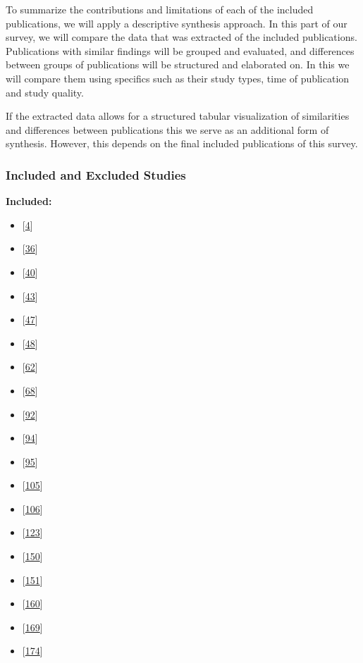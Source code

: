 \documentclass[]{book}
\providecommand{\tightlist}{%
  \setlength{\itemsep}{0pt}\setlength{\parskip}{0pt}}
\begin{document}
To summarize the contributions and limitations of each of the included
publications, we will apply a descriptive synthesis approach. In this
part of our survey, we will compare the data that was extracted of the
included publications. Publications with similar findings will be
grouped and evaluated, and differences between groups of publications
will be structured and elaborated on. In this we will compare them using
specifics such as their study types, time of publication and study
quality.

If the extracted data allows for a structured tabular visualization of
similarities and differences between publications this we serve as an
additional form of synthesis. However, this depends on the final
included publications of this survey.

\subsubsection{Included and Excluded
Studies}\label{included-and-excluded-studies}

\textbf{Included:}

\begin{itemize}
\tightlist
\item
  {[}\protect\hyperlink{ref-adams2016a}{4}{]}
\item
  {[}\protect\hyperlink{ref-castelluccio2017a}{36}{]}
\item
  {[}\protect\hyperlink{ref-cesar2017a}{40}{]}
\item
  {[}\protect\hyperlink{ref-claes2017a}{43}{]}
\item
  {[}\protect\hyperlink{ref-da2014a}{47}{]}
\item
  {[}\protect\hyperlink{ref-da2016a}{48}{]}
\item
  {[}\protect\hyperlink{ref-dyck2015a}{62}{]}
\item
  {[}\protect\hyperlink{ref-fujibayashi2017a}{68}{]}
\item
  {[}\protect\hyperlink{ref-karvonen2017a}{92}{]}
\item
  {[}\protect\hyperlink{ref-kerzazi2013a}{94}{]}
\item
  {[}\protect\hyperlink{ref-khomh2015a}{95}{]}
\item
  {[}\protect\hyperlink{ref-laukkanen2017a}{105}{]}
\item
  {[}\protect\hyperlink{ref-laukkanen2018a}{106}{]}
\item
  {[}\protect\hyperlink{ref-mantyla2015a}{123}{]}
\item
  {[}\protect\hyperlink{ref-plewnia2014a}{150}{]}
\item
  {[}\protect\hyperlink{ref-poo-caamano2016a}{151}{]}
\item
  {[}\protect\hyperlink{ref-rodriguez2017a}{160}{]}
\item
  {[}\protect\hyperlink{ref-souza2015a}{169}{]}
\item
  {[}\protect\hyperlink{ref-teixeira2017a}{174}{]}
\end{itemize}
\end{document}
